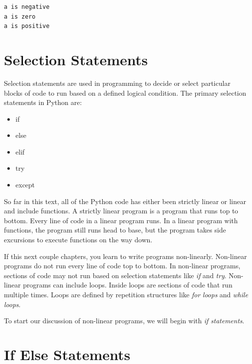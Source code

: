 \documentclass{book}
\providecommand{\tightlist}{%
      \setlength{\itemsep}{0pt}\setlength{\parskip}{0pt}}
\begin{document}
    \begin{Verbatim}[commandchars=\\\{\}]
a is negative
a is zero
a is positive

    \end{Verbatim}


    
        \section{Selection Statements}\label{selection-statements}
    




    
        Selection statements are used in programming to decide or select
particular blocks of code to run based on a defined logical condition.
The primary selection statements in Python are:

\begin{itemize}
\tightlist
\item
  if
\item
  else
\item
  elif
\item
  try
\item
  except
\end{itemize}
    




    
        So far in this text, all of the Python code has either been strictly
linear or linear and include functions. A strictly linear program is a
program that runs top to bottom. Every line of code in a linear program
runs. In a linear program with functions, the program still runs head to
base, but the program takes side excursions to execute functions on the
way down.

If this next couple chapters, you learn to write programs non-linearly.
Non-linear programs do not run every line of code top to bottom. In
non-linear programs, sections of code may not run based on selection
statements like \emph{if} and \emph{try}. Non-linear programs can
include loops. Inside loops are sections of code that run multiple
times. Loops are defined by repetition structures like \emph{for loops}
and \emph{while loops}.

To start our discussion of non-linear programs, we will begin with
\emph{if statements}.
    




    
        \section{If Else Statements}\label{if-else-statements}
    
\end{document}
